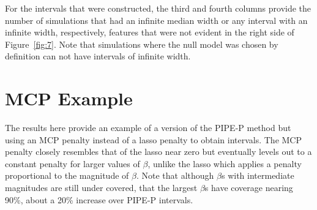 For the intervals that were constructed, the third and fourth columns provide the number of simulations that had an infinite median width or any interval with an infinite width, respectively, features that were not evident in the right side of Figure~\ref{fig:7}. Note that simulations where the null model was chosen by definition can not have intervals of infinite width.

\begin{table}[hb]
  \singlespace
  \centering
  
  \caption{Additional details about the number and width of intervals constructed by Selective Inference for the simulation in Section~\ref{Sec:Comparison} where, for each sample size, 1000 datasets were generated. Note, Selective Inference only constructs intervals for selected features.}
  \label{tab:D1}
\end{table}

\clearpage


\section{MCP Example}\label{sup:MCP}

\begin{table}[hbtp]
  \centering
  
  \caption{\label{tab:E1} Coverage rates by magnitude of $\beta$ for PIPE-P intervals using both the lasso and the MCP penalty applied to 1000 datasets generated under the Sparse 1 scenario (described in Section~\ref{Sec:distribution}) with $n = 100$ and $p = 101$. Prior to normalizing so that $SNR = 1$, Sparse 1 has $\bb_{1-10} = \pm(0.5, 0.5, 0.5, 1, 2)$ with the rest of the parameters set equal to zero. The nominal coverage rate is 95\%. }
\end{table}

The results here provide an example of a version of the PIPE-P method but using an MCP penalty instead of a lasso penalty to obtain intervals. The MCP penalty closely resembles that of the lasso near zero but eventually levels out to a constant penalty for larger values of $\beta$, unlike the lasso which applies a penalty proportional to the magnitude of $\beta$. Note that although $\beta$s with intermediate magnitudes are still under covered, that the largest $\beta$s have coverage nearing 90\%, about a 20\% increase over PIPE-P intervals.
